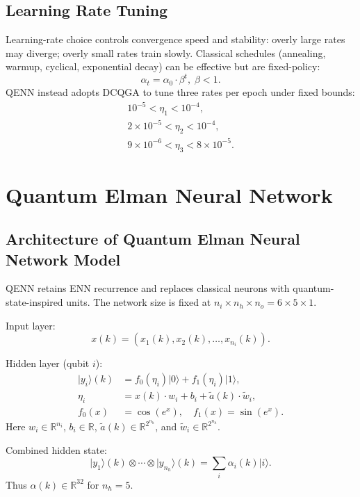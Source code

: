 \documentclass[conference]{IEEEtran}
\begin{document}
\subsection{Learning Rate Tuning}
Learning-rate choice controls convergence speed and stability: overly large rates may diverge; overly small rates train slowly. Classical schedules (annealing, warmup, cyclical, exponential decay) can be effective but are fixed-policy:
\begin{equation}
\alpha_t = \alpha_0\cdot\beta^t,\;\beta<1. \label{eq6}
\end{equation}
QENN instead adopts DCQGA to tune three rates per epoch under fixed bounds:
\begin{align}
10^{-5}<\eta_1<10^{-4}, \label{eq7}\\
2\times 10^{-5}<\eta_2<10^{-4}, \label{eq8}\\
9\times 10^{-6}<\eta_3<8\times10^{-5}. \label{eq9}
\end{align}

\section{Quantum Elman Neural Network}
\subsection{Architecture of Quantum Elman Neural Network Model}
QENN retains ENN recurrence and replaces classical neurons with quantum-state-inspired units. The network size is fixed at $n_i\times n_h\times n_o=6\times5\times1$.

Input layer:
\begin{equation}
x(k)=(x_1(k),x_2(k),\ldots,x_{n_i}(k)). \label{eq10}
\end{equation}

Hidden layer (qubit $i$):
\begin{align}
\lvert y_i\rangle(k) &= f_0(\eta_i)\lvert 0\rangle + f_1(\eta_i)\lvert 1\rangle, \label{eq11}\\
\eta_i &= x(k)\cdot w_i + b_i + \tilde a(k)\cdot\tilde w_i, \label{eq12}\\
f_0(x)&=\cos(e^x),\quad f_1(x)=\sin(e^x). \label{eq13}
\end{align}
Here $w_i\in\mathbb{R}^{n_i}$, $b_i\in\mathbb{R}$, $\tilde a(k)\in\mathbb{R}^{2^{n_h}}$, and $\tilde w_i\in\mathbb{R}^{2^{n_h}}$.

Combined hidden state:
\begin{equation}
\lvert y_1\rangle(k)\otimes\cdots\otimes\lvert y_{n_h}\rangle(k)=\sum_i\alpha_i(k)\lvert i\rangle. \label{eq14}
\end{equation}
Thus $\alpha(k)\in\mathbb{R}^{32}$ for $n_h=5$.
\end{document}
